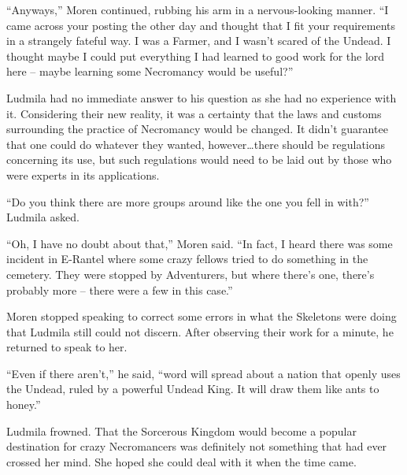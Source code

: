  

“Anyways,” Moren continued, rubbing his arm in a nervous-looking manner. “I came across your posting the other day and thought that I fit your requirements in a strangely fateful way. I was a Farmer, and I wasn’t scared of the Undead. I thought maybe I could put everything I had learned to good work for the lord here – maybe learning some Necromancy would be useful?”

 

Ludmila had no immediate answer to his question as she had no experience with it. Considering their new reality, it was a certainty that the laws and customs surrounding the practice of Necromancy would be changed. It didn’t guarantee that one could do whatever they wanted, however…there should be regulations concerning its use, but such regulations would need to be laid out by those who were experts in its applications.

 

“Do you think there are more groups around like the one you fell in with?” Ludmila asked.

 

“Oh, I have no doubt about that,” Moren said. “In fact, I heard there was some incident in E-Rantel where some crazy fellows tried to do something in the cemetery. They were stopped by Adventurers, but where there’s one, there’s probably more – there were a few in this case.”

 

Moren stopped speaking to correct some errors in what the Skeletons were doing that Ludmila still could not discern. After observing their work for a minute, he returned to speak to her.

 

“Even if there aren’t,” he said, “word will spread about a nation that openly uses the Undead, ruled by a powerful Undead King. It will draw them like ants to honey.”

 

Ludmila frowned. That the Sorcerous Kingdom would become a popular destination for crazy Necromancers was definitely not something that had ever crossed her mind. She hoped she could deal with it when the time came.